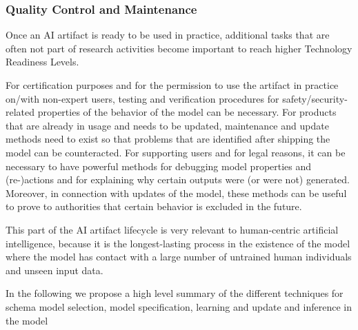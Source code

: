 \subsubsection{Quality Control and  Maintenance}
Once an AI artifact is ready to be used in practice,
additional tasks that are often not part of research activities become important
to reach higher Technology Readiness Levels.

For certification purposes and for the permission to use the artifact in practice on/with non-expert users, testing and verification procedures for safety/security-related properties of the behavior of the model can be necessary.
%
For products that are already in usage and needs to be updated,
maintenance and update methods need to exist so that problems that are identified after shipping the model can be counteracted.
%
For supporting users and for legal reasons, it can be necessary to have powerful methods for debugging model properties and (re-)actions and for explaining why certain outputs were (or were not) generated. Moreover, in connection with updates of the model, these methods can be useful to prove to authorities that certain behavior is excluded in the future.

This part of the AI artifact lifecycle is very relevant to human-centric artificial intelligence, because it is the longest-lasting process in the existence of the model where the model has contact with a large number of untrained human individuals and unseen input data.


In the following we propose a high level summary of the different
techniques for schema model selection, model specification, learning
and update and inference in the model
